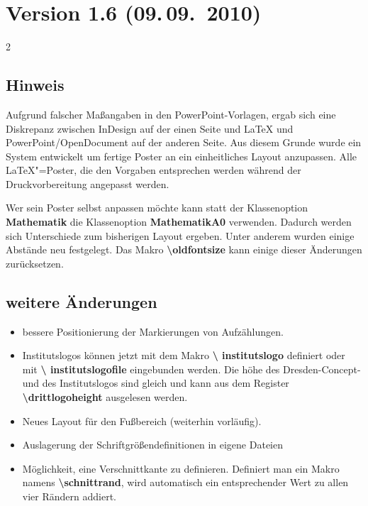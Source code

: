 \documentclass[a0paper,noDIN,MathematikA0]{tudmathposter}
\begin{document}
\section{Version 1.6 (09.\,09.~2010)}
\begin{multicols}2
\subsection{\textcolor{HKS07K100}{Hinweis}}
Aufgrund falscher Maßangaben in den PowerPoint-Vorlagen, ergab sich
eine Diskrepanz zwischen InDesign auf der einen Seite und \LaTeX{} und
PowerPoint/OpenDocument auf der anderen Seite. Aus diesem Grunde wurde
ein System entwickelt um fertige Poster an ein einheitliches Layout
anzupassen. Alle \LaTeX{}"=Poster, die den Vorgaben entsprechen werden
während der Druckvorbereitung angepasst werden.

Wer sein Poster selbst anpassen möchte kann statt der Klassenoption
\textbf{Mathematik} die Klassenoption \textbf{MathematikA0}
verwenden. Dadurch werden sich Unterschiede zum bisherigen Layout
ergeben. Unter anderem wurden einige Abstände neu festgelegt. Das
Makro \textbf{\textbackslash oldfontsize} kann einige dieser
Änderungen zurücksetzen.

\subsection{weitere Änderungen}
\begin{itemize}
\item bessere Positionierung der Markierungen von Aufzählungen.
\item Institutslogos können jetzt mit dem Makro \textbf{\textbackslash
    institutslogo} definiert oder mit \textbf{\textbackslash
    institutslogofile} eingebunden werden. Die höhe des
  Dresden-Concept- und des Institutslogos sind gleich und kann aus dem
  Register \textbf{\textbackslash drittlogoheight} ausgelesen werden.
\item Neues Layout für den Fußbereich (weiterhin vorläufig).
\item Auslagerung der Schriftgrößendefinitionen in eigene Dateien
\item Möglichkeit, eine Verschnittkante zu definieren. Definiert man
  ein Makro namens \textbf{\textbackslash schnittrand}, wird
  automatisch ein entsprechender Wert zu allen vier Rändern addiert. 
\end{itemize}
\end{multicols}
\vspace{\sectiontopskip}
\end{document}
